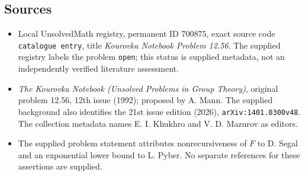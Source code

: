 \documentclass[11pt]{article}
\begin{document}
\subsection{Sources}
\begin{itemize}
\item Local UnsolvedMath registry, permanent ID \(700875\), exact source code \texttt{catalogue entry}, title \emph{Kourovka Notebook Problem 12.56}. The supplied registry labels the problem \texttt{open}; this status is supplied metadata, not an independently verified literature assessment.
\item \emph{The Kourovka Notebook (Unsolved Problems in Group Theory)}, original problem 12.56, 12th issue (1992); proposed by A. Mann. The supplied background also identifies the 21st issue edition (2026), \texttt{arXiv:1401.0300v48}. The collection metadata names E. I. Khukhro and V. D. Mazurov as editors.
\item The supplied problem statement attributes nonrecursiveness of \(F\) to D. Segal and an exponential lower bound to L. Pyber. No separate references for these assertions are supplied.
\end{itemize}
\end{document}
